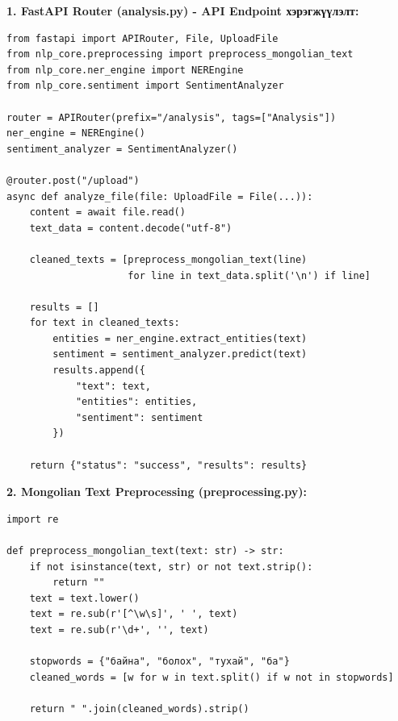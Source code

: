 \documentclass[12pt,a4paper]{report}
\begin{document}
\textbf{1. FastAPI Router (analysis.py) - API Endpoint хэрэгжүүлэлт:}
\begin{verbatim}
from fastapi import APIRouter, File, UploadFile
from nlp_core.preprocessing import preprocess_mongolian_text
from nlp_core.ner_engine import NEREngine
from nlp_core.sentiment import SentimentAnalyzer

router = APIRouter(prefix="/analysis", tags=["Analysis"])
ner_engine = NEREngine()
sentiment_analyzer = SentimentAnalyzer()

@router.post("/upload")
async def analyze_file(file: UploadFile = File(...)):
    content = await file.read()
    text_data = content.decode("utf-8")
    
    cleaned_texts = [preprocess_mongolian_text(line) 
                     for line in text_data.split('\n') if line]
    
    results = []
    for text in cleaned_texts:
        entities = ner_engine.extract_entities(text)
        sentiment = sentiment_analyzer.predict(text)
        results.append({
            "text": text,
            "entities": entities,
            "sentiment": sentiment
        })
        
    return {"status": "success", "results": results}
\end{verbatim}

\textbf{2. Mongolian Text Preprocessing (preprocessing.py):}
\begin{verbatim}
import re

def preprocess_mongolian_text(text: str) -> str:
    if not isinstance(text, str) or not text.strip():
        return ""
    text = text.lower()
    text = re.sub(r'[^\w\s]', ' ', text)
    text = re.sub(r'\d+', '', text)
    
    stopwords = {"байна", "болох", "тухай", "ба"}
    cleaned_words = [w for w in text.split() if w not in stopwords]
    
    return " ".join(cleaned_words).strip()
\end{verbatim}
\end{document}
